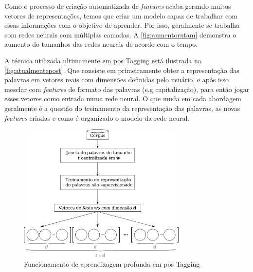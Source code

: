 Como o processo de criação automatizada de \textit{features} acaba gerando muitos vetores de representações, temos que criar um modelo capaz de trabalhar com essas informações com o objetivo de aprender. Por isso, geralmente se trabalha com redes neurais com múltiplas camadas. A \autoref{fig:aumentorntam} demonstra o aumento do tamanhos das redes neurais de acordo com o tempo. 

A técnica utilizada ultimamente em \ac{pos} Tagging está ilustrada na \autoref{fig:atualmentepost}. Que consiste em primeiramente obter a representação das palavras em vetores reais com dimensões definidas pelo usuário, e após isso mesclar com \textit{features} de formato das palavras (e.g capitalização), para então jogar esses vetores como entrada numa rede neural. O que muda em cada abordagem geralmente é a questão do treinamento da representação das palavras, as novas \textit{features} criadas e como é organizado o modelo da rede neural.

\begin{figure}
\centering
\caption{Funcionamento de aprendizagem profunda em \ac{pos} Tagging} \label{fig:atualmentepost}
\includegraphics[width=0.75\textwidth]{img/deeplearningfunc}
\end{figure}

